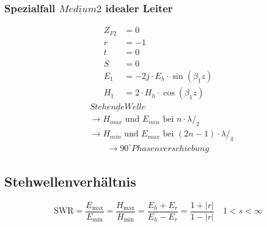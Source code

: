 \subsubsection[Spezialfall Medium 2 idealer Leiter]{Spezialfall $\underline{Medium 2}$ idealer Leiter}
\begin{align*}
    Z_{F2}       & = 0                                 \\
    r            & = -1                                \\
    t            & = 0                                 \\
    \overline{S} & = 0                                 \\
    E_1          & = -2j\cdot E_h\cdot \sin(\beta_1 z) \\
    H_1          & = 2\cdot H_h\cdot \cos(\beta_1 z)
\end{align*}
\begin{align*}
     & \underline{Stehende Welle}                                              \\
     & \rightarrow \text{$H_{max}$ und $E_{min}$ bei } n \cdot \lambda/_2      \\
     & \rightarrow \text{$H_{min}$ und $E_{max}$ bei } (2n-1) \cdot \lambda/_4 \\
     & \qquad \rightarrow 90^\circ Phasenverschiebung
\end{align*}

\subsection{Stehwellenverhältnis}
\[
    \mathrm{SWR} = \frac{E_{\max}}{E_{\min}}=\frac{H_{\max}}{H_{\min}}=\frac{E_{h}+E_{r}}{E_{h}-E_{r}} = \frac{1+|r|}{1-|r|} \quad 1<s<\infty
\]

\newpage
